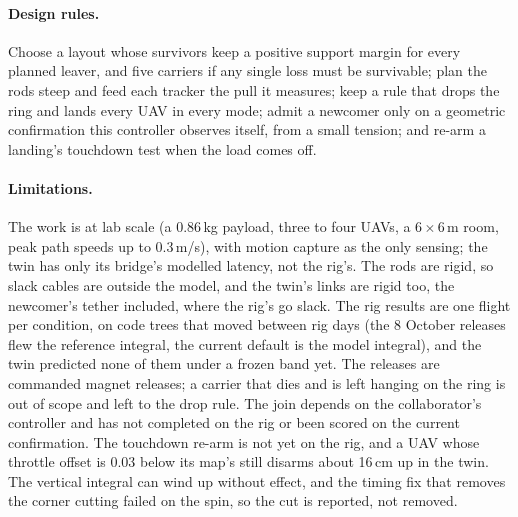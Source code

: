 %


\paragraph{Design rules.} Choose a layout whose survivors keep a positive support margin for every planned leaver,
and five carriers if any single loss must be survivable; plan the rods steep and feed each tracker the pull it
measures; keep a rule that drops the ring and lands every UAV in every mode; admit a newcomer only on a geometric
confirmation this controller observes itself, from a small tension; and re-arm a landing's touchdown test when the
load comes off.

\paragraph{Limitations.} The work is at lab scale (a 0.86\,kg payload, three to four UAVs, a 6\,$\times$\,6\,m room,
peak path speeds up to 0.3\,m/s), with motion capture as the only sensing; the twin has only its bridge's modelled latency, not the rig's. The
rods are rigid, so slack cables are outside the model, and the twin's links
are rigid too, the newcomer's tether included, where the rig's go slack. The rig results are one flight per condition,
on code trees that moved between rig days (the 8 October releases flew the reference integral, the current default is
the model integral), and the twin predicted none of them under a frozen band yet. The releases are commanded magnet
releases; a carrier that dies and is left hanging on the ring is out of scope and left to the drop rule.  The join depends on the collaborator's
controller and has not completed on the rig or been scored on the current confirmation. The touchdown re-arm is not yet
on the rig, and a UAV whose throttle offset is 0.03 below its map's still disarms about 16\,cm up in the twin. The vertical integral
can wind up without effect, and the timing fix that removes the corner cutting failed on the spin, so the cut is
reported, not removed.
